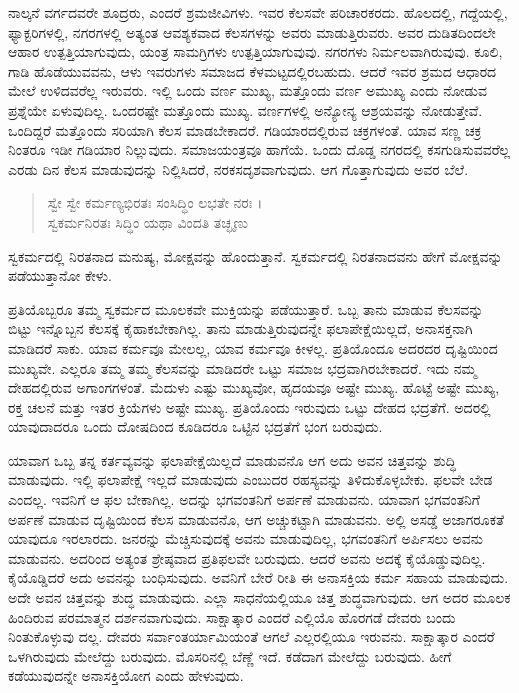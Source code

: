 ನಾಲ್ಕನೆ ವರ್ಗದವರೇ ಶೂದ್ರರು, ಎಂದರೆ ಶ್ರಮಜೀವಿಗಳು. ಇವರ ಕೆಲಸವೇ ಪರಿಚಾರಕರದು. ಹೊಲದಲ್ಲಿ, ಗದ್ದೆಯಲ್ಲಿ, ಫ್ಯಾಕ್ಟರಿಗಳಲ್ಲಿ, ನಗರಗಳಲ್ಲಿ ಅತ್ಯಂತ ಆವಶ್ಯಕವಾದ ಕೆಲಸಗಳನ್ನು ಅವರು ಮಾಡುತ್ತಿರುವರು. ಅವರ ದುಡಿತದಿಂದಲೇ ಆಹಾರ ಉತ್ಪತ್ತಿಯಾಗುವುದು, ಯಂತ್ರ ಸಾಮಗ್ರಿಗಳು ಉತ್ಪತ್ತಿಯಾಗುವುವು. ನಗರಗಳು ನಿರ್ಮಲವಾಗಿರುವುವು. ಕೂಲಿ, ಗಾಡಿ ಹೊಡೆಯುವವನು, ಆಳು ಇವರುಗಳು ಸಮಾಜದ ಕೆಳಮಟ್ಟದಲ್ಲಿರಬಹುದು. ಆದರೆ ಇವರ ಶ್ರಮದ ಆಧಾರದ ಮೇಲೆ ಉಳಿದವರೆಲ್ಲ ಇರುವರು. ಇಲ್ಲಿ ಒಂದು ವರ್ಣ ಮುಖ್ಯ, ಮತ್ತೊಂದು ವರ್ಣ ಅಮುಖ್ಯ ಎಂದು ನೋಡುವ ಪ್ರಶ್ನೆಯೇ ಏಳುವುದಿಲ್ಲ. ಒಂದರಷ್ಟೇ ಮತ್ತೊಂದು ಮುಖ್ಯ. ವರ್ಣಗಳಲ್ಲಿ ಅನ್ಯೋನ್ಯ ಆಶ್ರಯವನ್ನು ನೋಡುತ್ತೇವೆ. ಒಂದಿದ್ದರೆ ಮತ್ತೊಂದು ಸರಿಯಾಗಿ ಕೆಲಸ ಮಾಡಬೇಕಾದರೆ. ಗಡಿಯಾರದಲ್ಲಿರುವ ಚಕ್ರಗಳಂತೆ. ಯಾವ ಸಣ್ಣ ಚಕ್ರ ನಿಂತರೂ ಇಡೀ ಗಡಿಯಾರ ನಿಲ್ಲುವುದು. ಸಮಾಜಯಂತ್ರವೂ ಹಾಗೆಯೆ. ಒಂದು ದೊಡ್ಡ ನಗರದಲ್ಲಿ ಕಸಗುಡಿಸುವವರೆಲ್ಲ ಎರಡು ದಿನ ಕೆಲಸ ಮಾಡುವುದನ್ನು ನಿಲ್ಲಿಸಿದರೆ, ನರಕಸದೃಶವಾಗುವುದು. ಆಗ ಗೊತ್ತಾಗುವುದು ಅವರ ಬೆಲೆ.

\begin{verse}
ಸ್ವೇ ಸ್ವೇ ಕರ್ಮಣ್ಯಭಿರತಃ ಸಂಸಿದ್ಧಿಂ ಲಭತೇ ನರಃ ।\\ಸ್ವಕರ್ಮನಿರತಃ ಸಿದ್ಧಿಂ ಯಥಾ ವಿಂದತಿ ತಚ್ಛೃಣು 
\end{verse}

{\small ಸ್ವಕರ್ಮದಲ್ಲಿ ನಿರತನಾದ ಮನುಷ್ಯ, ಮೋಕ್ಷವನ್ನು ಹೊಂದುತ್ತಾನೆ. ಸ್ವಕರ್ಮದಲ್ಲಿ ನಿರತನಾದವನು ಹೇಗೆ ಮೋಕ್ಷವನ್ನು ಪಡೆಯುತ್ತಾನೋ ಕೇಳು.}

ಪ್ರತಿಯೊಬ್ಬರೂ ತಮ್ಮ ಸ್ವಕರ್ಮದ ಮೂಲಕವೇ ಮುಕ್ತಿಯನ್ನು ಪಡೆಯುತ್ತಾರೆ. ಒಬ್ಬ ತಾನು ಮಾಡುವ ಕೆಲಸವನ್ನು ಬಿಟ್ಟು ಇನ್ನೊಬ್ಬನ ಕೆಲಸಕ್ಕೆ ಕೈಹಾಕಬೇಕಾಗಿಲ್ಲ. ತಾನು ಮಾಡುತ್ತಿರುವುದನ್ನೇ ಫಲಾಪೇಕ್ಷೆಯಿಲ್ಲದೆ, ಅನಾಸಕ್ತನಾಗಿ ಮಾಡಿದರೆ ಸಾಕು. ಯಾವ ಕರ್ಮವೂ ಮೇಲಲ್ಲ, ಯಾವ ಕರ್ಮವೂ ಕೀಳಲ್ಲ. ಪ್ರತಿಯೊಂದೂ ಅದರದರ ದೃಷ್ಟಿಯಿಂದ ಮುಖ್ಯವೇ. ಎಲ್ಲರೂ ತಮ್ಮ ತಮ್ಮ ಕೆಲಸವನ್ನು ಮಾಡಿದರೇ ಒಟ್ಟು ಸಮಾಜ ಭದ್ರವಾಗಿರಬೇಕಾದರೆ. ಇದು ನಮ್ಮ ದೇಹದಲ್ಲಿರುವ ಅಗಾಂಗಗಳಂತೆ. ಮೆದುಳು ಎಷ್ಟು ಮುಖ್ಯವೋ, ಹೃದಯವೂ ಅಷ್ಟೇ ಮುಖ್ಯ. ಹೊಟ್ಟೆ ಅಷ್ಟೇ ಮುಖ್ಯ, ರಕ್ತ ಚಲನೆ ಮತ್ತು ಇತರ ಕ್ರಿಯೆಗಳು ಅಷ್ಟೇ ಮುಖ್ಯ. ಪ್ರತಿಯೊಂದು ಇರುವುದು ಒಟ್ಟು ದೇಹದ ಭದ್ರತೆಗೆ. ಅದರಲ್ಲಿ ಯಾವುದಾದರೂ ಒಂದು ದೋಷದಿಂದ ಕೂಡಿದರೂ ಒಟ್ಟಿನ ಭದ್ರತೆಗೆ ಭಂಗ ಬರುವುದು.

ಯಾವಾಗ ಒಬ್ಬ ತನ್ನ ಕರ್ತವ್ಯವನ್ನು ಫಲಾಪೇಕ್ಷೆಯಿಲ್ಲದೆ ಮಾಡುವನೊ ಆಗ ಅದು ಅವನ ಚಿತ್ತವನ್ನು ಶುದ್ಧಿ ಮಾಡುವುದು. ಇಲ್ಲಿ ಫಲಾಪೇಕ್ಷೆ ಇಲ್ಲದೆ ಮಾಡುವುದು ಎಂಬುದರ ರಹಸ್ಯವನ್ನು ತಿಳಿದುಕೊಳ್ಳಬೇಕು. ಫಲವೇ ಬೇಡ ಎಂದಲ್ಲ. ಇವನಿಗೆ ಆ ಫಲ ಬೇಕಾಗಿಲ್ಲ. ಅದನ್ನು ಭಗವಂತನಿಗೆ ಅರ್ಪಣೆ ಮಾಡುವನು. ಯಾವಾಗ ಭಗವಂತನಿಗೆ ಅರ್ಪಣೆ ಮಾಡುವ ದೃಷ್ಟಿಯಿಂದ ಕೆಲಸ ಮಾಡುವನೊ, ಆಗ ಅಚ್ಚುಕಟ್ಟಾಗಿ ಮಾಡುವನು. ಅಲ್ಲಿ ಅಸಡ್ಡೆ ಅಜಾಗರೂಕತೆ ಯಾವುದೂ ಇರಲಾರದು. ಜನರನ್ನು ಮೆಚ್ಚಿಸುವುದಕ್ಕೆ ಅವನು ಮಾಡುವುದಿಲ್ಲ, ಭಗವಂತನಿಗೆ ಅರ್ಪಿಸಲು ಅವನು ಮಾಡುವನು. ಅದರಿಂದ ಅತ್ಯಂತ ಶ್ರೇಷ್ಠವಾದ ಪ್ರತಿಫಲವೇ ಬರುವುದು. ಆದರೆ ಅವನು ಅದಕ್ಕೆ ಕೈಯೊಡ್ಡುವುದಿಲ್ಲ. ಕೈಯೊಡ್ಡಿದರೆ ಅದು ಅವನನ್ನು ಬಂಧಿಸುವುದು. ಅವನಿಗೆ ಬೇರೆ ರೀತಿ ಈ ಅನಾಸಕ್ತಿಯ ಕರ್ಮ ಸಹಾಯ ಮಾಡುವುದು. ಅದೇ ಅವನ ಚಿತ್ತವನ್ನು ಶುದ್ಧ ಮಾಡುವುದು. ಎಲ್ಲಾ ಸಾಧನೆಯಲ್ಲಿಯೂ ಚಿತ್ತ ಶುದ್ಧವಾಗುವುದು. ಆಗ ಅದರ ಮೂಲಕ ಹಿಂದಿರುವ ಪರಮಾತ್ಮನ ದರ್ಶನವಾಗುವುದು. ಸಾಕ್ಷಾತ್ಕಾರ ಎಂದರೆ ಎಲ್ಲಿಯೊ ಹೊರಗಡೆ ದೇವರು ಬಂದು ನಿಂತುಕೊಳ್ಳುವು ದಲ್ಲ. ದೇವರು ಸರ್ವಾಂತರ್ಯಾಮಿಯಂತೆ ಆಗಲೆ ಎಲ್ಲರಲ್ಲಿಯೂ ಇರುವನು. ಸಾಕ್ಷಾತ್ಕಾರ ಎಂದರೆ ಒಳಗಿರುವುದು ಮೇಲೆದ್ದು ಬರುವುದು. ಮೊಸರಿನಲ್ಲಿ ಬೆಣ್ಣೆ ಇದೆ. ಕಡೆದಾಗ ಮೇಲೆದ್ದು ಬರುವುದು. ಹೀಗೆ ಕಡೆಯುವುದನ್ನೇ ಅನಾಸಕ್ತಿಯೋಗ ಎಂದು ಹೇಳುವುದು.

